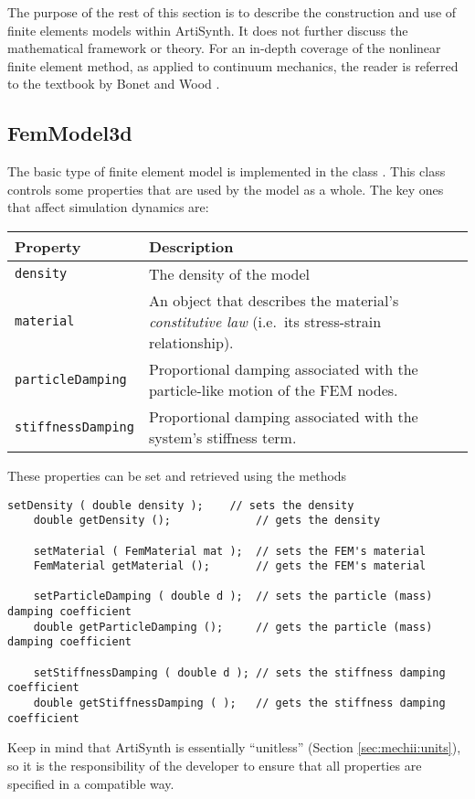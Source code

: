 The purpose of the rest of this section is to describe the construction and
use of finite elements models within ArtiSynth.  It does not further discuss 
the mathematical framework or theory.
For an in-depth coverage of the nonlinear finite element method, as applied
to continuum mechanics, the reader is referred to the textbook by Bonet and 
Wood \cite{bonet:fem:2000}.

\subsection{FemModel3d}
\label{sec:fem:structure}

The basic type of finite element model is implemented in the class 
.  This class controls some
properties that are used by the model as a whole.  The key ones that affect
simulation dynamics are:
\begin{center}
	\begin{tabular}{|ll|}
		\hline
		Property & Description\\
		\hline
		{\tt density} & The density of the model\\
		{\tt material} & An object that describes the material's 
		    \emph{constitutive law} (i.e.~its stress-strain relationship).\\
		{\tt particleDamping} & Proportional damping associated with the 
		    particle-like motion of the FEM nodes.\\
		{\tt stiffnessDamping} & Proportional damping associated with the 
		    system's stiffness term.\\
		\hline
	\end{tabular}
\end{center}
These properties can be set and retrieved using the methods
\begin{lstlisting}[]
	setDensity ( double density );    // sets the density
	double getDensity ();             // gets the density

	setMaterial ( FemMaterial mat );  // sets the FEM's material
	FemMaterial getMaterial ();       // gets the FEM's material

	setParticleDamping ( double d );  // sets the particle (mass) damping coefficient
	double getParticleDamping ();     // gets the particle (mass) damping coefficient

	setStiffnessDamping ( double d ); // sets the stiffness damping coefficient
	double getStiffnessDamping ( );   // gets the stiffness damping coefficient
\end{lstlisting}
Keep in mind that ArtiSynth is essentially ``unitless'' (Section 
\ref{sec:mechii:units}), so it is the responsibility of the developer to
ensure that all properties are specified in a compatible way.  

